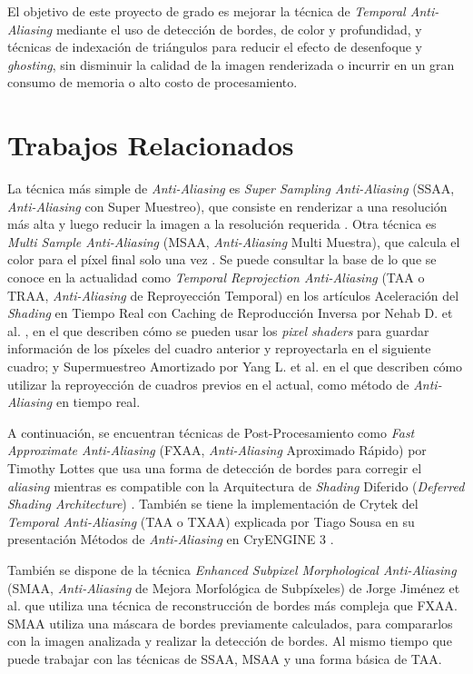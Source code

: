 \documentclass[pregrado]{tesis-usb} %
\begin{document}
El objetivo de este proyecto de grado es mejorar la técnica de \textit{Temporal Anti-Aliasing} mediante el uso de detección de bordes, de color y profundidad, y técnicas de indexación de triángulos para reducir el efecto de desenfoque y \textit{ghosting}, sin disminuir la calidad de la imagen renderizada o incurrir en un gran consumo de memoria o alto costo de procesamiento.


\section{Trabajos Relacionados}
La técnica más simple de \textit{Anti-Aliasing} es \textit{Super Sampling Anti-Aliasing} (SSAA, \textit{Anti-Aliasing} con Super Muestreo), que consiste en renderizar a una resolución más alta y luego reducir la imagen a la resolución requerida \cite{Doggett2017EDAN35}. Otra técnica es \textit{Multi Sample Anti-Aliasing} (MSAA, \textit{Anti-Aliasing} Multi Muestra), que calcula el color para el píxel final solo una vez \cite{Doggett2017EDAN35}. Se puede consultar la base de lo que se conoce en la actualidad como \textit{Temporal Reprojection Anti-Aliasing} (TAA o TRAA, \textit{Anti-Aliasing} de Reproyección Temporal) en los artículos Aceleración del \textit{Shading} en Tiempo Real con Caching de Reproducción Inversa por Nehab D. et al.  \cite{Nehab2007}, en el que describen cómo se pueden usar los \textit{pixel shaders} para guardar información de los píxeles del cuadro anterior y reproyectarla en el siguiente cuadro; y Supermuestreo Amortizado por Yang L. et al.  \cite{Yang2009} en el que describen cómo utilizar la reproyección de cuadros previos  en el actual, como método de \textit{Anti-Aliasing} en tiempo real.

A continuación, se encuentran técnicas de Post-Procesamiento como \textit{Fast Approximate Anti-Aliasing} (FXAA, \textit{Anti-Aliasing} Aproximado Rápido) por Timothy Lottes \cite{Lottes2009} que usa una forma de detección de bordes para corregir el \textit{aliasing} mientras es compatible con la Arquitectura de \textit{Shading} Diferido (\textit{Deferred Shading Architecture}) \cite{Doggett2017EDAN35}. También se tiene la implementación de Crytek del \textit{Temporal Anti-Aliasing} (TAA o TXAA) explicada por Tiago Sousa en su presentación Métodos de \textit{Anti-Aliasing} en CryENGINE 3 \cite{JIMENEZ2011_SIGGRAPH11}.

También se dispone de la técnica \textit{Enhanced Subpixel Morphological Anti-Aliasing} (SMAA, \textit{Anti-Aliasing} de Mejora Morfológica de Subpíxeles) de Jorge Jiménez et al. \cite{Jimenez2012} que utiliza una técnica de reconstrucción de bordes más compleja que FXAA. SMAA utiliza una máscara de bordes previamente calculados, para compararlos con la imagen analizada y realizar la detección de bordes. Al mismo tiempo que puede trabajar con las técnicas de SSAA, MSAA y una forma básica de TAA.
\end{document}
